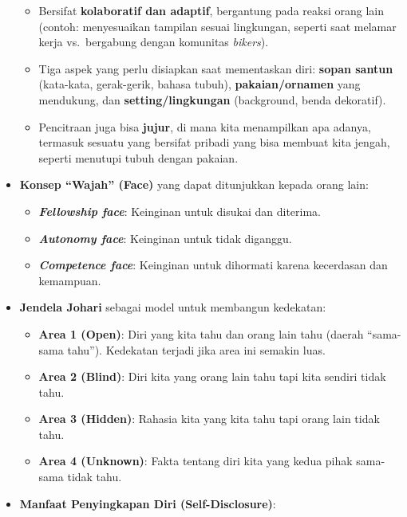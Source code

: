 \documentclass[
  letterpaper,
  DIV=11,
  numbers=noendperiod]{scrreprt}
\providecommand{\tightlist}{%
  \setlength{\itemsep}{0pt}\setlength{\parskip}{0pt}}
\begin{document}
\begin{itemize}
  \begin{itemize}
  \tightlist
  \item
    Bersifat \textbf{kolaboratif dan adaptif}, bergantung pada reaksi
    orang lain (contoh: menyesuaikan tampilan sesuai lingkungan, seperti
    saat melamar kerja vs.~bergabung dengan komunitas \emph{bikers}).
  \item
    Tiga aspek yang perlu disiapkan saat mementaskan diri: \textbf{sopan
    santun} (kata-kata, gerak-gerik, bahasa tubuh),
    \textbf{pakaian/ornamen} yang mendukung, dan
    \textbf{setting/lingkungan} (background, benda dekoratif).
  \item
    Pencitraan juga bisa \textbf{jujur}, di mana kita menampilkan apa
    adanya, termasuk sesuatu yang bersifat pribadi yang bisa membuat
    kita jengah, seperti menutupi tubuh dengan pakaian.
  \end{itemize}
\item
  \textbf{Konsep ``Wajah'' (Face)} yang dapat ditunjukkan kepada orang
  lain:

  \begin{itemize}
  \tightlist
  \item
    \textbf{\emph{Fellowship face}}: Keinginan untuk disukai dan
    diterima.
  \item
    \textbf{\emph{Autonomy face}}: Keinginan untuk tidak diganggu.
  \item
    \textbf{\emph{Competence face}}: Keinginan untuk dihormati karena
    kecerdasan dan kemampuan.
  \end{itemize}
\item
  \textbf{Jendela Johari} sebagai model untuk membangun kedekatan:

  \begin{itemize}
  \tightlist
  \item
    \textbf{Area 1 (Open)}: Diri yang kita tahu dan orang lain tahu
    (daerah ``sama-sama tahu''). Kedekatan terjadi jika area ini semakin
    luas.
  \item
    \textbf{Area 2 (Blind)}: Diri kita yang orang lain tahu tapi kita
    sendiri tidak tahu.
  \item
    \textbf{Area 3 (Hidden)}: Rahasia kita yang kita tahu tapi orang
    lain tidak tahu.
  \item
    \textbf{Area 4 (Unknown)}: Fakta tentang diri kita yang kedua pihak
    sama-sama tidak tahu.
  \end{itemize}
\item
  \textbf{Manfaat Penyingkapan Diri (Self-Disclosure)}:


\end{itemize}
\end{document}
